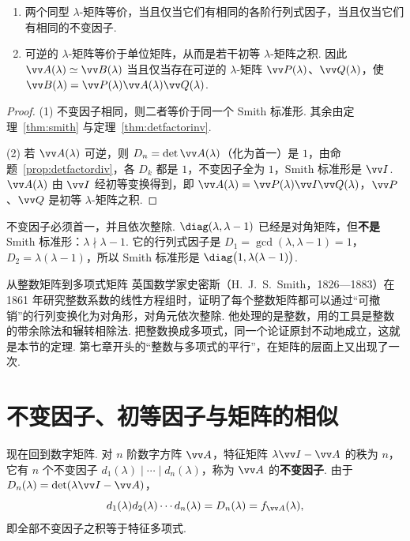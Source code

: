 	\begin{corollary}\label{cor:lambdaequiv}
		\begin{enumerate}
			\item 两个同型 $\lambda$-矩阵等价，当且仅当它们有相同的各阶行列式因子，当且仅当它们有相同的不变因子.
			\item 可逆的 $\lambda$-矩阵等价于单位矩阵，从而是若干初等 $\lambda$-矩阵之积. 因此 $\vv A(\lambda)\simeq\vv B(\lambda)$ 当且仅当存在可逆的 $\lambda$-矩阵 $\vv P(\lambda)$、$\vv Q(\lambda)$，使 $\vv B(\lambda)=\vv P(\lambda)\vv A(\lambda)\vv Q(\lambda)$.
		\end{enumerate}
	\end{corollary}
	\begin{proof}
		(1) 不变因子相同，则二者等价于同一个 Smith 标准形. 其余由定理~\ref{thm:smith} 与定理~\ref{thm:detfactorinv}.
		
		(2) 若 $\vv A(\lambda)$ 可逆，则 $D_n=\det\vv A(\lambda)$（化为首一）是 $1$，由命题~\ref{prop:detfactordiv}，各 $D_k$ 都是 $1$，不变因子全为 $1$，Smith 标准形是 $\vv I$. $\vv A(\lambda)$ 由 $\vv I$ 经初等变换得到，即 $\vv A(\lambda)=\vv P(\lambda)\vv I\vv Q(\lambda)$，$\vv P$、$\vv Q$ 是初等 $\lambda$-矩阵之积.
	\end{proof}
	
	\begin{pitfallbox}
		不变因子必须首一，并且依次整除. $\diag(\lambda,\lambda-1)$ 已经是对角矩阵，但\textbf{不是} Smith 标准形：$\lambda\nmid\lambda-1$. 它的行列式因子是 $D_1=\gcd(\lambda,\lambda-1)=1$，$D_2=\lambda(\lambda-1)$，所以 Smith 标准形是 $\diag\big(1,\lambda(\lambda-1)\big)$.
	\end{pitfallbox}
	
	\begin{historybox}{从整数矩阵到多项式矩阵}
		英国数学家史密斯（H.~J.~S.~Smith，1826—1883）在 1861 年研究整数系数的线性方程组时，证明了每个整数矩阵都可以通过“可撤销”的行列变换化为对角形，对角元依次整除. 他处理的是整数，用的工具是整数的带余除法和辗转相除法. 把整数换成多项式，同一个论证原封不动地成立，这就是本节的定理. 第七章开头的“整数与多项式的平行”，在矩阵的层面上又出现了一次.
	\end{historybox}
	
	\section{\hB 不变因子、初等因子与矩阵的相似}\label{sec:similarity}
	
	现在回到数字矩阵. 对 $n$ 阶数字方阵 $\vv A$，特征矩阵 $\lambda\vv I-\vv A$ 的秩为 $n$，它有 $n$ 个不变因子 $d_1(\lambda)\mid\cdots\mid d_n(\lambda)$，称为 $\vv A$ 的\textbf{不变因子}. 由于 $D_n(\lambda)=\det(\lambda\vv I-\vv A)$，
	\[d_1(\lambda)d_2(\lambda)\cdots d_n(\lambda)=D_n(\lambda)=f_{\vv A}(\lambda),\]
	即全部不变因子之积等于特征多项式.
	

